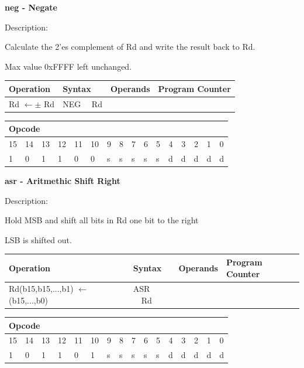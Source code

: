 \documentclass[%
	pdftex,
	a4paper,
	oneside,
	bibtotoc,%
	idxtotoc,%
	bibtotocnumbered,
	halfparskip,%
]{scrbook}
\begin{document}
\bigskip

\textbf{neg - Negate}

Description:

Calculate the 2'es complement of Rd and write the result back to Rd.

Max value 0xFFFF left unchanged.

\begin{tabular}{|l|l|l|l|}
\hline
Operation & Syntax & Operands & Program Counter \\ \hline
Rd $\leftarrow \pm $ Rd & NEG \ \ Rd &  &  \\ \hline
\end{tabular}

\begin{tabular}{|c|c|c|c|c|c|c|c|c|c|c|c|c|c|c|c|}
\hline
\multicolumn{6}{|l|}{Opcode} & \multicolumn{5}{|l|}{} & \multicolumn{5}{|l|}{
} \\ \hline
15 & 14 & 13 & 12 & 11 & 10 & 9 & 8 & 7 & 6 & 5 & 4 & 3 & 2 & 1 & 0 \\ \hline
\multicolumn{1}{|l|}{1} & \multicolumn{1}{|l|}{0} & \multicolumn{1}{|l|}{1}
& \multicolumn{1}{|l|}{1} & \multicolumn{1}{|l|}{0} & \multicolumn{1}{|l|}{0}
& \multicolumn{1}{|l|}{s} & \multicolumn{1}{|l|}{s} & \multicolumn{1}{|l|}{s}
& \multicolumn{1}{|l|}{s} & \multicolumn{1}{|l|}{s} & \multicolumn{1}{|l|}{d}
& \multicolumn{1}{|l|}{d} & \multicolumn{1}{|l|}{d} & \multicolumn{1}{|l|}{d}
& \multicolumn{1}{|l|}{d} \\ \hline
\end{tabular}

\bigskip

\textbf{asr - Aritmethic Shift Right}

Description:

Hold MSB and shift all bits in Rd one bit to the right

LSB is shifted out.

\begin{tabular}{|l|l|l|l|}
\hline
Operation & Syntax & Operands & Program Counter \\ \hline
Rd(b15,b15,...,b1) $\leftarrow $ (b15,...,b0) & ASR \ \ Rd &  &  \\ \hline
\end{tabular}

\begin{tabular}{|c|c|c|c|c|c|c|c|c|c|c|c|c|c|c|c|}
\hline
\multicolumn{6}{|l|}{Opcode} & \multicolumn{5}{|l|}{} & \multicolumn{5}{|l|}{
} \\ \hline
15 & 14 & 13 & 12 & 11 & 10 & 9 & 8 & 7 & 6 & 5 & 4 & 3 & 2 & 1 & 0 \\ \hline
\multicolumn{1}{|l|}{1} & \multicolumn{1}{|l|}{0} & \multicolumn{1}{|l|}{1}
& \multicolumn{1}{|l|}{1} & \multicolumn{1}{|l|}{0} & \multicolumn{1}{|l|}{1}
& \multicolumn{1}{|l|}{s} & \multicolumn{1}{|l|}{s} & \multicolumn{1}{|l|}{s}
& \multicolumn{1}{|l|}{s} & \multicolumn{1}{|l|}{s} & \multicolumn{1}{|l|}{d}
& \multicolumn{1}{|l|}{d} & \multicolumn{1}{|l|}{d} & \multicolumn{1}{|l|}{d}
& \multicolumn{1}{|l|}{d} \\ \hline
\end{tabular}
\end{document}
